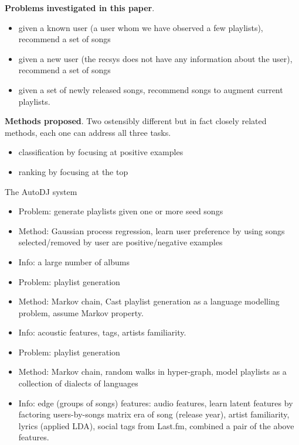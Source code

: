 {\bf Problems investigated in this paper}.
\begin{itemize}
\item given a known user (a user whom we have observed a few playlists), recommend a set of songs
\item given a new user (the recsys does not have any information about the user), recommend a set of songs
\item given a set of newly released songs, recommend songs to augment current playlists.
\end{itemize}

{\bf Methods proposed}.
Two ostensibly different but in fact closely related methods,
each one can address all three tasks.
\begin{itemize}
\item classification by focusing at positive examples
\item ranking by focusing at the top
\end{itemize}



The AutoDJ system~\cite{platt2002learning} 
\begin{itemize}
\item Problem: generate playlists given one or more seed songs
\item Method: Gaussian process regression, learn user preference by using songs selected/removed by user are positive/negative examples
\item Info: a large number of albums
\end{itemize}


\cite{mcfee2011natural}
\begin{itemize}
\item Problem: playlist generation
\item Method: Markov chain, Cast playlist generation as a language modelling problem, assume Markov property.
\item Info: acoustic features, tags, artists familiarity.
\end{itemize}


\cite{mcfee2012hypergraph}
\begin{itemize}
\item Problem: playlist generation 
\item Method: Markov chain, random walks in hyper-graph, model playlists as a collection of dialects of languages
\item Info: edge (\ie groups of songs) features:  audio features, learn latent features by factoring users-by-songs matrix 
era of song (release year), artist familiarity, lyrics (applied LDA), social tags from Last.fm, combined a pair of the above features.
\end{itemize}


